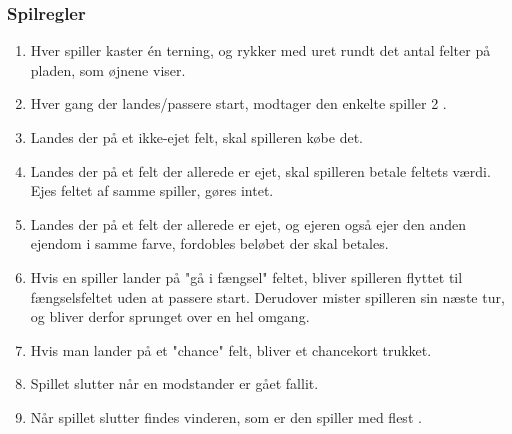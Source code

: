 \smallskip
\subsubsection{Spilregler}
\begin{enumerate}
    \item Hver spiller kaster én terning, og rykker med uret rundt det antal felter på pladen, som øjnene viser.
    \item Hver gang der landes/passere start, modtager den enkelte spiller 2 {}.
    \item Landes der på et ikke-ejet felt, skal spilleren købe det.
    \item Landes der på et felt der allerede er ejet, skal spilleren betale feltets værdi. Ejes feltet af samme spiller, gøres intet.
    \item Landes der på et felt der allerede er ejet, og ejeren også ejer den anden ejendom i samme farve, fordobles beløbet der skal betales.
    \item Hvis en spiller lander på "gå i fængsel" feltet, bliver spilleren flyttet til fængselsfeltet uden at passere start. Derudover mister spilleren sin næste tur, og bliver derfor sprunget over en hel omgang.
    \item Hvis man lander på et "chance" felt, bliver et chancekort trukket.
    
    \item Spillet slutter når en modstander er gået fallit. 
    \item Når spillet slutter findes vinderen, som er den spiller med flest {}.
\end{enumerate}



\bigskip



